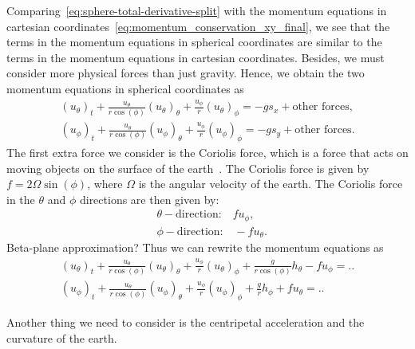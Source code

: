 Comparing~\eqref{eq:sphere-total-derivative-split} with the momentum equations in cartesian coordinates~\eqref{eq:momentum_conservation_xy_final}, we see that the terms in the momentum equations in spherical coordinates are similar to the terms in the momentum equations in cartesian coordinates.
Besides, we must consider more physical forces than just gravity.
Hence, we obtain the two momentum equations in spherical coordinates as
\begin{equation}
    \begin{aligned}
         {(u_\theta)}_t + \frac{u_\theta}{r \cos(\phi)} {(u_\theta)}_\theta + \frac{u_\phi}{r} {(u_\theta)}_\phi = -g s_x + \text{other forces}, \\
        {( u_\phi)}_t + \frac{u_\theta}{r \cos(\phi)} {(u_\phi)}_\theta   + \frac{u_\phi}{r} {(u_\phi)}_\phi = - g s_y + \text{other forces}.
    \end{aligned}
\end{equation}
The first extra force we consider is the Coriolis force, which is a force that acts on moving objects on the surface of the earth~\cite{Coriolis}.
The Coriolis force is given by $f = 2 \Omega \sin(\phi)$, where $\Omega$ is the angular velocity of the earth.
The Coriolis force in the $\theta$ and $\phi$ directions are then given by:
\begin{align*}
    &\theta-\text{direction:} \quad f u_\phi,\\
    &\phi-\text{direction:} \quad -f u_\theta.
\end{align*}
Beta-plane approximation?
Thus we can rewrite the momentum equations as
\begin{equation}
    \begin{aligned}
         {(u_\theta)}_t + \frac{u_\theta}{r \cos(\phi)} {(u_\theta)}_\theta + \frac{u_\phi}{r} {(u_\theta)}_\phi + \frac{g}{r \cos(\phi)} h_\theta - f u_\phi = .. \\
        {( u_\phi)}_t + \frac{u_\theta}{r \cos(\phi)} {(u_\phi)}_\theta   + \frac{u_\phi}{r} {(u_\phi)}_\phi + \frac{g}{r} h_\phi + f u_\theta = ..
    \end{aligned}
\end{equation}

Another thing we need to consider is the centripetal acceleration and the curvature of the earth.





